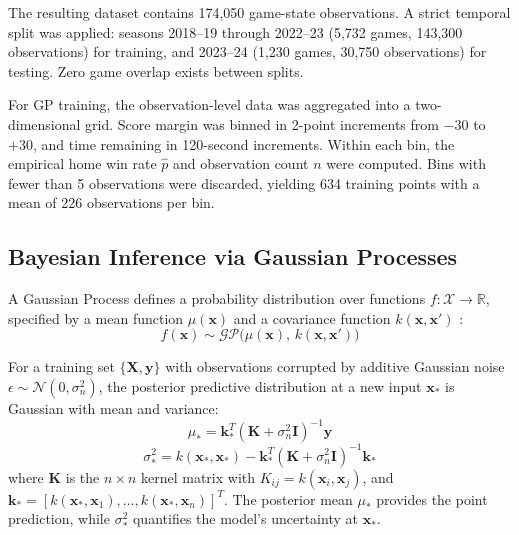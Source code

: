 \documentclass[conference]{IEEEtran}
\begin{document}
The resulting dataset contains 174,050 game-state observations. A strict temporal split was applied: seasons 2018--19 through 2022--23 (5,732 games, 143,300 observations) for training, and 2023--24 (1,230 games, 30,750 observations) for testing. Zero game overlap exists between splits.

For GP training, the observation-level data was aggregated into a two-dimensional grid. Score margin was binned in 2-point increments from $-30$ to $+30$, and time remaining in 120-second increments. Within each bin, the empirical home win rate $\hat{p}$ and observation count $n$ were computed. Bins with fewer than 5 observations were discarded, yielding 634 training points with a mean of 226 observations per bin.

\subsection{Bayesian Inference via Gaussian Processes}

A Gaussian Process defines a probability distribution over functions $f: \mathcal{X} \to \mathbb{R}$, specified by a mean function $\mu(\mathbf{x})$ and a covariance function $k(\mathbf{x}, \mathbf{x}')$ \cite{rasmussen2006, pilario2023}:
%
\begin{equation}
f(\mathbf{x}) \sim \mathcal{GP}\big(\mu(\mathbf{x}),\, k(\mathbf{x}, \mathbf{x}')\big)
\end{equation}

For a training set $\{\mathbf{X}, \mathbf{y}\}$ with observations corrupted by additive Gaussian noise $\epsilon \sim \mathcal{N}(0, \sigma_n^2)$, the posterior predictive distribution at a new input $\mathbf{x}_*$ is Gaussian with mean and variance:
%
\begin{equation}
\mu_* = \mathbf{k}_*^T (\mathbf{K} + \sigma_n^2 \mathbf{I})^{-1} \mathbf{y}
\label{eq:gp_mean}
\end{equation}
%
\begin{equation}
\sigma_*^2 = k(\mathbf{x}_*, \mathbf{x}_*) - \mathbf{k}_*^T (\mathbf{K} + \sigma_n^2 \mathbf{I})^{-1} \mathbf{k}_*
\label{eq:gp_var}
\end{equation}
%
where $\mathbf{K}$ is the $n \times n$ kernel matrix with $K_{ij} = k(\mathbf{x}_i, \mathbf{x}_j)$, and $\mathbf{k}_* = [k(\mathbf{x}_*, \mathbf{x}_1), \ldots, k(\mathbf{x}_*, \mathbf{x}_n)]^T$. The posterior mean $\mu_*$ provides the point prediction, while $\sigma_*^2$ quantifies the model's uncertainty at $\mathbf{x}_*$.
\end{document}

